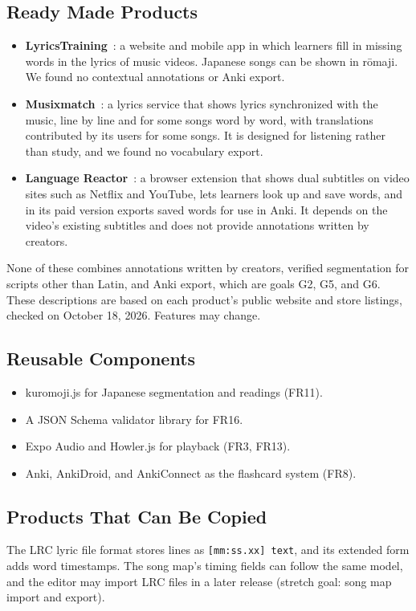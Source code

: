 \documentclass[12pt]{article}
\begin{document}
\subsection{Ready Made Products} \label{SecReadyMade}
\begin{itemize}
    \item \textbf{LyricsTraining}~\cite{LyricsTraining}: a website and mobile
          app in which learners fill in missing words in the lyrics of music
          videos. Japanese songs can be shown in r\=omaji. We found no
          contextual annotations or Anki export.
    \item \textbf{Musixmatch}~\cite{Musixmatch}: a lyrics service that shows
          lyrics synchronized with the music, line by line and for some songs
          word by word, with translations contributed by its users for some
          songs. It is designed for listening rather than study, and we found
          no vocabulary export.
    \item \textbf{Language Reactor}~\cite{LanguageReactor}: a browser
          extension that shows dual subtitles on video sites such as Netflix
          and YouTube, lets learners look up and save words, and in its paid
          version exports saved words for use in Anki. It depends on the
          video's existing subtitles and does not provide annotations written
          by creators.
\end{itemize}
None of these combines annotations written by creators, verified segmentation
for scripts other than Latin, and Anki export, which are goals G2, G5, and G6.
These descriptions are based on each product's public website and store
listings, checked on October 18, 2026. Features may change.

\subsection{Reusable Components}
\begin{itemize}
    \item kuromoji.js for Japanese segmentation and readings (FR11).
    \item A JSON Schema validator library for FR16.
    \item Expo Audio and Howler.js for playback (FR3, FR13).
    \item Anki, AnkiDroid, and AnkiConnect as the flashcard system (FR8).
\end{itemize}

\subsection{Products That Can Be Copied} \label{SecCopied}
The LRC lyric file format stores lines as \texttt{[mm:ss.xx] text}, and its
extended form adds word timestamps. The song map's timing fields can follow the
same model, and the editor may import LRC files in a later release
(stretch goal: song map import and export).
\end{document}
